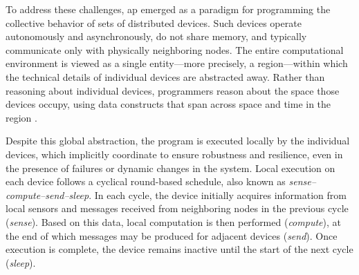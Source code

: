 \documentclass[runningheads]{llncs}
\begin{document}
To address these challenges, \acf{ap} emerged as a paradigm for programming the collective behavior of sets of distributed devices. Such devices operate autonomously and asynchronously, do not share memory, and typically communicate only with physically neighboring nodes. The entire computational environment is viewed as a single entity—more precisely, a region—within which the technical details of individual devices are abstracted away. Rather than reasoning about individual devices, programmers reason about the space those devices occupy, using data constructs that span across space and time in the region \cite{BPV-COMPUTER2015}.

Despite this global abstraction, the program is executed locally by the individual devices, which implicitly coordinate to ensure robustness and resilience, even in the presence of failures or dynamic changes in the system.
%
Local execution on each device follows a cyclical round-based schedule, also known as \emph{sense–compute–send–sleep}. In each cycle, the device initially acquires information from local sensors and messages received from neighboring nodes in the previous cycle (\emph{sense}). Based on this data, local computation is then performed (\emph{compute}), at the end of which messages may be produced for adjacent devices (\emph{send}). Once execution is complete, the device remains inactive until the start of the next cycle (\emph{sleep}).
\end{document}
